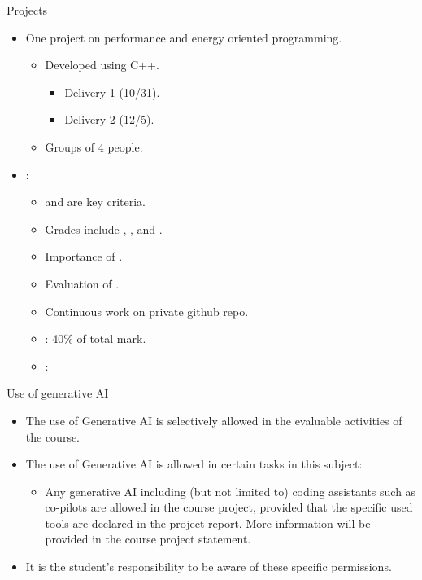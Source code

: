 \begin{frame}[t]{Projects}
\begin{itemize}
  \item One project on performance and energy oriented programming.
    \begin{itemize}
        \item Developed using C++.
        \begin{itemize}
          \item Delivery 1 (10/31).
          \item Delivery 2 (12/5).
        \end{itemize}
        \item Groups of 4 people.
    \end{itemize}

    \item {}:
      \begin{itemize}
        \item {} and  are key criteria.
        \item Grades include , , 
              and .
        \item Importance of .
        \item Evaluation of .
        \item Continuous work on private github repo.
        \item {}: 40\% of total mark.
        \item {}: 
    \end{itemize}
\end{itemize}
\end{frame}

\begin{frame}[t]{Use of generative AI}
\begin{itemize}

\item The use of Generative AI is selectively allowed in the evaluable activities of the course.

\item The use of Generative AI is allowed in certain tasks in this subject:

  \begin{itemize}
    \item Any generative AI including (but not limited to) coding assistants such as co-pilots are allowed in the course project, provided that the specific used tools are declared in the project report. More information will be provided in the course project statement.
  \end{itemize}

\item It is the student's responsibility to be aware of these specific permissions.
\end{itemize}
\end{frame}

